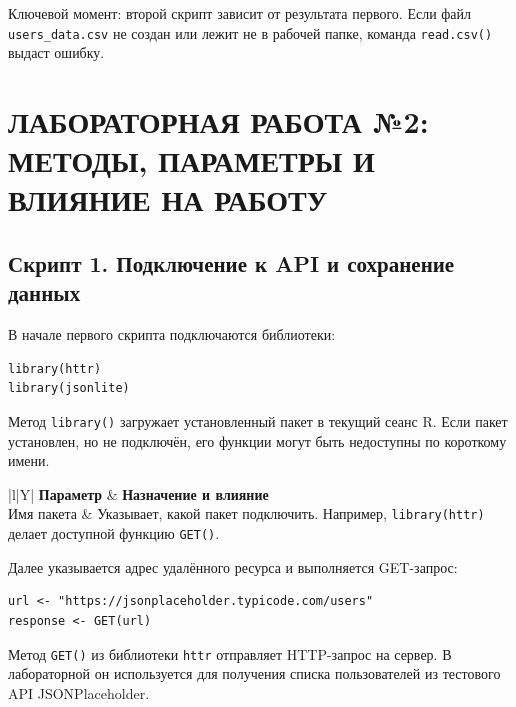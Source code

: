 \documentclass[14pt,a4paper]{extarticle}
\begin{document}
Ключевой момент: второй скрипт зависит от результата первого. Если файл \texttt{users\_data.csv} не создан или лежит не в рабочей папке, команда \texttt{read.csv()} выдаст ошибку.

\newpage

\section{ЛАБОРАТОРНАЯ РАБОТА №2: МЕТОДЫ, ПАРАМЕТРЫ И ВЛИЯНИЕ НА РАБОТУ}

\subsection{Скрипт 1. Подключение к API и сохранение данных}

В начале первого скрипта подключаются библиотеки:

\begin{lstlisting}
library(httr)
library(jsonlite)
\end{lstlisting}

Метод \texttt{library()} загружает установленный пакет в текущий сеанс R. Если пакет установлен, но не подключён, его функции могут быть недоступны по короткому имени.

\begin{table}[H]
\caption{Метод \texttt{library()}}
\begin{tabularx}{\textwidth}{|l|Y|}
\hline
\textbf{Параметр} & \textbf{Назначение и влияние} \\
\hline
Имя пакета & Указывает, какой пакет подключить. Например, \texttt{library(httr)} делает доступной функцию \texttt{GET()}. \\
\hline
\end{tabularx}
\end{table}

Далее указывается адрес удалённого ресурса и выполняется GET-запрос:

\begin{lstlisting}
url <- "https://jsonplaceholder.typicode.com/users"
response <- GET(url)
\end{lstlisting}

Метод \texttt{GET()} из библиотеки \texttt{httr} отправляет HTTP-запрос на сервер. В лабораторной он используется для получения списка пользователей из тестового API JSONPlaceholder.
\end{document}
